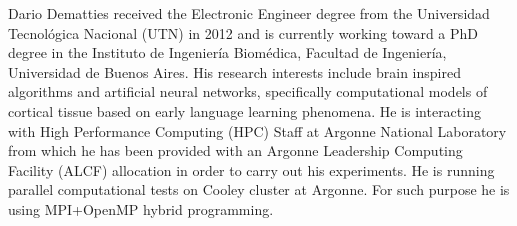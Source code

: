 \documentclass[10pt,journal,compsoc]{IEEEtran}
\begin{document}



%



% 

\begin{IEEEbiography}{Dario Dematties}
	received the Electronic Engineer degree from the Universidad Tecnol\'ogica Nacional (UTN) in 2012 and is currently working toward a PhD degree in the Instituto de Ingenier\'ia Biom\'edica, Facultad de Ingenier\'ia, Universidad de Buenos Aires. His research interests include brain inspired algorithms and artificial neural networks, specifically computational models of cortical tissue based on early language learning phenomena. He is interacting with High Performance Computing (HPC) Staff at Argonne National Laboratory from which he has been provided with an Argonne Leadership Computing Facility (ALCF) allocation in order to carry out his experiments. He is running parallel computational tests on Cooley cluster at Argonne. For such purpose he is using MPI+OpenMP hybrid programming.
\end{IEEEbiography}
\end{document}

